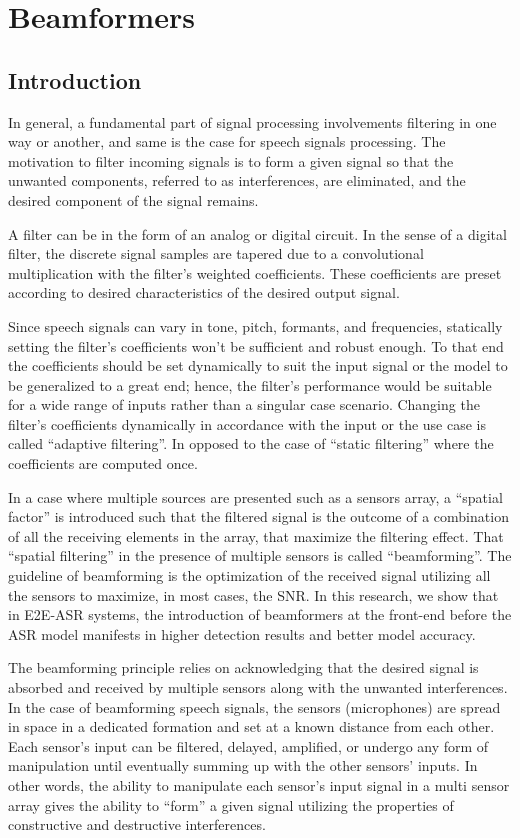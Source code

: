 \chapter{Beamformers}\label{ch:beamformers}
\section{Introduction}
In general, a fundamental part of signal processing 
involvements filtering in one way or another,
and same is the case for speech signals processing.
The motivation to filter incoming signals 
is to form a given signal so that the unwanted components, 
referred to as interferences, are eliminated,
and the desired component of the signal remains.

A filter can be in the form of an analog or digital circuit. 
In the sense of a digital filter, 
the discrete signal samples are tapered 
due to a convolutional multiplication with 
the filter's weighted coefficients.
These coefficients are preset according 
to desired characteristics of the desired output signal.

Since speech signals can vary in tone, pitch, 
formants, and frequencies, statically setting the filter's 
coefficients won't be sufficient 
and robust enough.
To that end the coefficients should be set dynamically
to suit the input signal or the model to be generalized 
to a great end; hence, the filter's performance 
would be suitable for a wide range of inputs rather than
a singular case scenario.
Changing the filter's coefficients dynamically in accordance
with the input or the use case is called ``adaptive filtering''.
In opposed to the case of ``static filtering'' where 
the coefficients are computed once. 

In a case where multiple sources are presented such
as a sensors array, a ``spatial factor'' is introduced
such that the filtered signal is the outcome of
a combination of all the receiving elements
in the array, that maximize the filtering effect.
That ``spatial filtering'' in the presence of
multiple sensors is called ``beamforming''.
The guideline of beamforming is the optimization of
the received signal utilizing all the sensors
to maximize, in most cases, the SNR.
In this research, we show that in E2E-ASR systems,
the introduction of beamformers at the front-end before
the ASR model manifests in higher detection results
and better model accuracy.

The beamforming principle relies on 
acknowledging that the desired signal 
is absorbed and received by multiple sensors 
along with the unwanted interferences. 
In the case of beamforming speech signals, 
the sensors (microphones) are spread in space in 
a dedicated formation and set at a 
known distance from each other.
Each sensor's input can be filtered, delayed, amplified, 
or undergo any form of manipulation 
until eventually summing up with the other sensors' inputs.
In other words, the ability to manipulate each sensor's 
input signal in a multi sensor array gives the ability
to ``form'' a given signal
utilizing the properties of constructive and destructive
interferences. 

